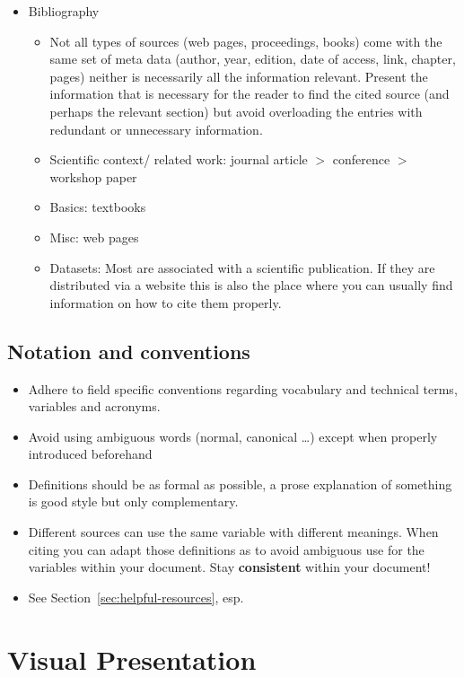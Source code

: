 \documentclass[logo, twocolumn]{mlai-report}
\begin{document}
\begin{itemize}
	\item Bibliography \label{general_bib}
	\begin{itemize}
		\item Not all types of sources (web pages, proceedings, books) come with the same set of meta data (author, year, edition, date of access, link, chapter, pages) neither is necessarily all the information relevant. Present the information that is necessary for the reader to find the cited source (and perhaps the relevant section) but avoid overloading the entries with redundant or unnecessary information.
		\item Scientific context/ related work: journal article $>$ conference $>$ workshop paper
		\item Basics: textbooks
		\item Misc: web pages
		\item Datasets: Most are associated with a scientific publication. If they are distributed via a website this is also the place where you can usually find information on how to cite them properly.
	\end{itemize}

\end{itemize}

\subsection{Notation and conventions}

\begin{itemize}
	\item Adhere to field specific conventions regarding vocabulary and technical terms, variables and acronyms.
	\item Avoid using ambiguous words (normal, canonical \dots) except when properly introduced beforehand
	\item Definitions should be as formal as possible, a prose explanation of something is good style but only complementary.
	\item Different sources can use the same variable with different meanings. When citing you can adapt those definitions as to avoid ambiguous use for the variables within your document. Stay \textbf{consistent} within your document!
	\item See Section~\ref{sec:helpful-resources}, esp. \cite[pp. 1-8]{knuth_mathematical_writing}
\end{itemize}

\section{Visual Presentation}
\end{document}
